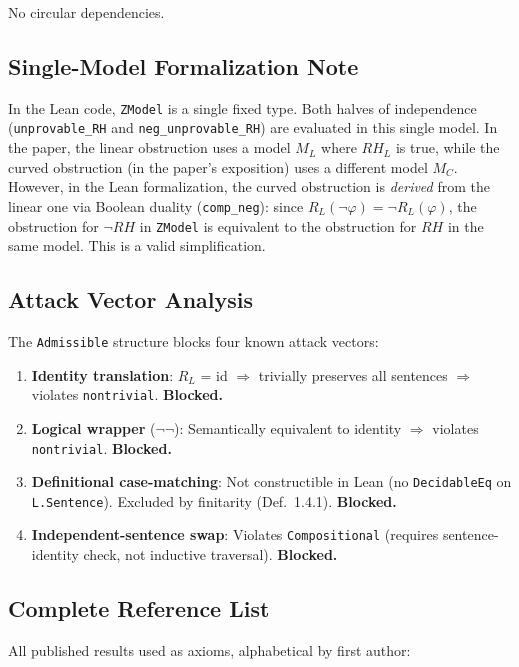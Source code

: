 No circular dependencies.

\subsection*{Single-Model Formalization Note}

In the Lean code, \texttt{ZModel} is a single fixed type. Both halves of
independence (\texttt{unprovable\_RH} and \texttt{neg\_unprovable\_RH}) are
evaluated in this single model. In the paper, the linear obstruction uses a
model $M_L$ where $RH_L$ is true, while the curved obstruction (in the paper's
exposition) uses a different model $M_C$. However, in the Lean formalization,
the curved obstruction is \emph{derived} from the linear one via Boolean
duality (\texttt{comp\_neg}): since $R_L(\neg\varphi) = \neg R_L(\varphi)$,
the obstruction for $\neg RH$ in \texttt{ZModel} is equivalent to the
obstruction for $RH$ in the same model. This is a valid simplification.

\subsection*{Attack Vector Analysis}

The \texttt{Admissible} structure blocks four known attack vectors:

\begin{enumerate}
\item \textbf{Identity translation}: $R_L$ = id $\Rightarrow$ trivially preserves all sentences $\Rightarrow$ violates \texttt{nontrivial}. \textbf{Blocked.}
\item \textbf{Logical wrapper} ($\neg\neg$): Semantically equivalent to identity $\Rightarrow$ violates \texttt{nontrivial}. \textbf{Blocked.}
\item \textbf{Definitional case-matching}: Not constructible in Lean (no \texttt{DecidableEq} on \texttt{L.Sentence}). Excluded by finitarity (Def.~1.4.1). \textbf{Blocked.}
\item \textbf{Independent-sentence swap}: Violates \texttt{Compositional} (requires sentence-identity check, not inductive traversal). \textbf{Blocked.}
\end{enumerate}

\subsection*{Complete Reference List}

All published results used as axioms, alphabetical by first author:

